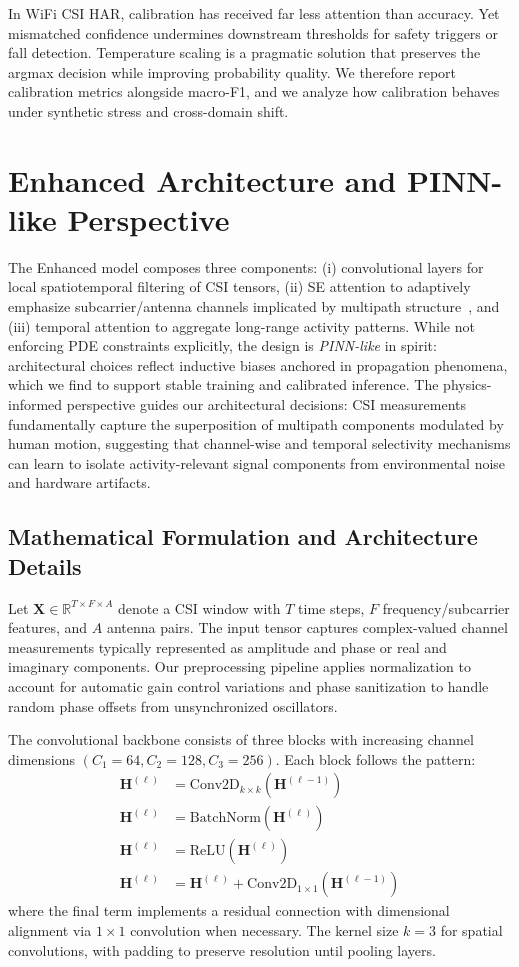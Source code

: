 \documentclass[journal]{IEEEtran}
\begin{document}
In WiFi CSI HAR, calibration has received far less attention than accuracy. Yet mismatched confidence undermines downstream thresholds for safety triggers or fall detection. Temperature scaling is a pragmatic solution that preserves the argmax decision while improving probability quality. We therefore report calibration metrics alongside macro-F1, and we analyze how calibration behaves under synthetic stress and cross-domain shift.

\section{Enhanced Architecture and PINN-like Perspective}
The Enhanced model composes three components: (i) convolutional layers for local spatiotemporal filtering of CSI tensors, (ii) SE attention to adaptively emphasize subcarrier/antenna channels implicated by multipath structure~\cite{se_networks2018}, and (iii) temporal attention to aggregate long-range activity patterns. While not enforcing PDE constraints explicitly, the design is \emph{PINN-like} in spirit: architectural choices reflect inductive biases anchored in propagation phenomena, which we find to support stable training and calibrated inference. The physics-informed perspective guides our architectural decisions: CSI measurements fundamentally capture the superposition of multipath components modulated by human motion, suggesting that channel-wise and temporal selectivity mechanisms can learn to isolate activity-relevant signal components from environmental noise and hardware artifacts.

\subsection{Mathematical Formulation and Architecture Details}
Let $\mathbf{X}\in \mathbb{R}^{T\times F\times A}$ denote a CSI window with $T$ time steps, $F$ frequency/subcarrier features, and $A$ antenna pairs. The input tensor captures complex-valued channel measurements typically represented as amplitude and phase or real and imaginary components. Our preprocessing pipeline applies normalization to account for automatic gain control variations and phase sanitization to handle random phase offsets from unsynchronized oscillators.

The convolutional backbone consists of three blocks with increasing channel dimensions $(C_1{=}64, C_2{=}128, C_3{=}256)$. Each block follows the pattern:
\begin{align}
\mathbf{H}^{(\ell)} &= \mathrm{Conv2D}_{k\times k}(\mathbf{H}^{(\ell-1)}) \\
\mathbf{H}^{(\ell)} &= \mathrm{BatchNorm}(\mathbf{H}^{(\ell)}) \\
\mathbf{H}^{(\ell)} &= \mathrm{ReLU}(\mathbf{H}^{(\ell)}) \\
\mathbf{H}^{(\ell)} &= \mathbf{H}^{(\ell)} + \mathrm{Conv2D}_{1\times 1}(\mathbf{H}^{(\ell-1)})
\end{align}
where the final term implements a residual connection with dimensional alignment via $1{\times}1$ convolution when necessary. The kernel size $k{=}3$ for spatial convolutions, with padding to preserve resolution until pooling layers.
\end{document}

